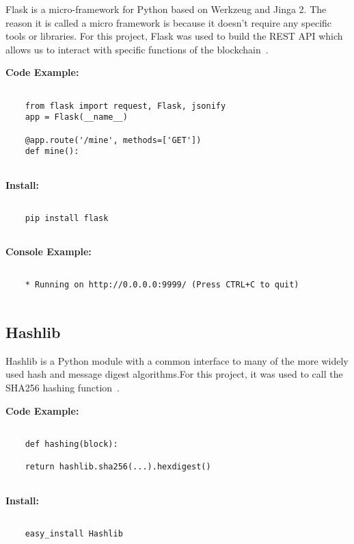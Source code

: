 Flask is a micro-framework for Python based on Werkzeug and Jinga
2. The reason it is called a micro framework is because it doesn't
require any specific tools or libraries. For this project, Flask was
used to build the REST API which allows us to interact with specific
functions of the
blockchain~\cite{hid-sp18-414-www-flask-python-microframewor}.

\bigskip
\noindent
\textbf{Code Example:}
\begin{footnotesize}
\begin{verbatim}

    from flask import request, Flask, jsonify
   	app = Flask(__name__)

    @app.route('/mine', methods=['GET'])
    def mine():
    
\end{verbatim}
\end{footnotesize}
\noindent
\textbf{Install:}
\begin{footnotesize}
\begin{verbatim}

    pip install flask
    
\end{verbatim}
\end{footnotesize}
\noindent
\textbf{Console Example:}
\begin{footnotesize}
\begin{verbatim}

    * Running on http://0.0.0.0:9999/ (Press CTRL+C to quit)
    
\end{verbatim}
\end{footnotesize}
\subsection{Hashlib}

Hashlib is a Python module with a common interface to many of the more widely used hash and 
message digest algorithms.For this project, it was used to call the SHA256 hashing function~\cite{hid-sp18-414-www-hashlib-secure}.

\bigskip
\noindent
\textbf{Code Example:}
\begin{footnotesize}
\begin{verbatim}

    def hashing(block):

    return hashlib.sha256(...).hexdigest()
    
\end{verbatim}
\end{footnotesize}
\noindent
\textbf{Install:}
\begin{footnotesize}
\begin{verbatim}

    easy_install Hashlib
    
\end{verbatim}
\end{footnotesize}

